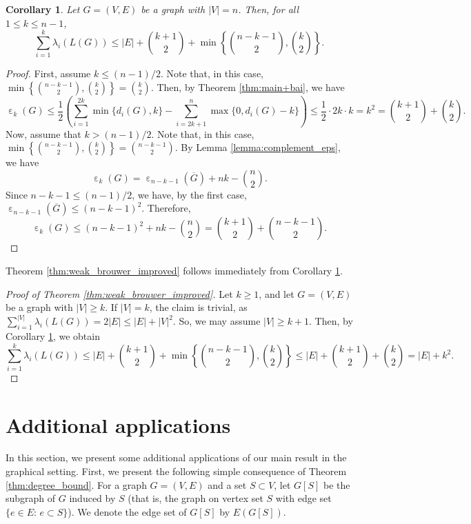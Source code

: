 \documentclass[a4paper,11pt]{article}
\theoremstyle{plain}
\newtheorem{corollary}[theorem]{\bf Corollary}
\theoremstyle{definition}
\numberwithin{theorem}{section}
\numberwithin{equation}{section}
\DeclareMathOperator{\eps}{\varepsilon}
\begin{document}
\begin{corollary}\label{cor:brouwer}
    Let $G=(V,E)$ be a graph with $|V|=n$. Then, for all $1\le k\le n-1$,
    \[
    \sum_{i=1}^k \lambda_i(L(G))\le |E|+\binom{k+1}{2}+\min\left\{\binom{n-k-1}{2},\binom{k}{2}\right\}.
    \]
\end{corollary}
\begin{proof}
    First, assume $k\le (n-1)/2$. Note that, in this case, $\min\left\{\binom{n-k-1}{2},\binom{k}{2}\right\}=\binom{k}{2}$. Then, by Theorem \ref{thm:main+bai}, we have
    \[
        \eps_k(G) \le \frac{1}{2}\left( \sum_{i=1}^{2k} \min\{d_i(G),k\} - \sum_{i=2k+1}^n \max\{0,d_i(G)-k\}\right) \le \frac{1}{2} \cdot 2k \cdot k = k^2 = \binom{k+1}{2}+\binom{k}{2}.
    \]
    Now, assume that $k > (n-1)/2$. Note that, in this case,  $  \min\left\{\binom{n-k-1}{2},\binom{k}{2}\right\}=\binom{n-k-1}{2}$. By Lemma \ref{lemma:complement_eps}, we have
    \[
        \eps_k(G) = \eps_{n-k-1}(\overline{G})+ nk -\binom{n}{2}.
    \]
    Since $n-k-1\le (n-1)/2$, we have, by the first case, $\eps_{n-k-1}(\overline{G}) \le (n-k-1)^2$. Therefore,
    \[
        \eps_k(G)\le   (n-k-1)^2+ nk-\binom{n}{2} = \binom{k+1}{2} + \binom{n-k-1}{2}.
    \]
\end{proof}

Theorem \ref{thm:weak_brouwer_improved} follows immediately from Corollary \ref{cor:brouwer}.

\begin{proof}[Proof of Theorem \ref{thm:weak_brouwer_improved}]
    Let $k\ge 1$, and let $G=(V,E)$ be a graph with $|V|\ge k$. 
    If $|V|=k$, the claim is trivial, as $\sum_{i=1}^{|V|} \lambda_i(L(G)) = 2|E|\le |E|+|V|^2$.
    So, we may assume $|V|\ge k+1$. Then, by Corollary \ref{cor:brouwer}, we obtain
    \[
    \sum_{i=1}^k \lambda_i(L(G))\le |E|+\binom{k+1}{2}+\min\left\{\binom{n-k-1}{2},\binom{k}{2}\right\} \le |E|+\binom{k+1}{2}+\binom{k}{2}= |E|+k^2.
    \]
\end{proof}

\section{Additional applications}\label{sec:apps}

In this section, we present some additional applications of our main result in the graphical setting. First, we present the following simple consequence of Theorem \ref{thm:degree_bound}. 
For a graph $G=(V,E)$ and a set $S\subset V$, let $G[S]$ be the subgraph of $G$ induced by $S$ (that is, the graph on vertex set $S$ with edge set $\{e\in E:\, e\subset S\}$). We denote the edge set of $G[S]$ by $E(G[S])$.
\end{document}
